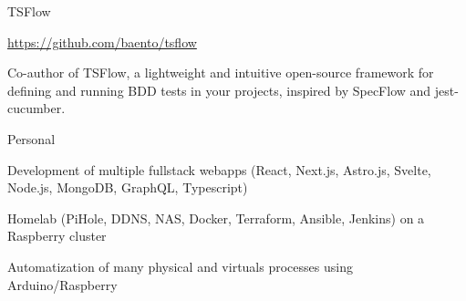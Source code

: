 
\begin{cventries}
  \cventrywithouttitleanddate
    {TSFlow} %
    {} %
    {
      \begin{cvitems} %
        \item {\href{https://github.com/baento/tsflow}{https://github.com/baento/tsflow}}
        \item {Co-author of TSFlow, a lightweight and intuitive open-source framework for defining and running BDD tests in your projects, inspired by SpecFlow and jest-cucumber.}
      \end{cvitems}
    }

  \cventry
    {} %
    {Personal} %
    {} %
    {} %
    {
      \begin{cvitems} %
        \item {Development of multiple fullstack webapps (React, Next.js, Astro.js, Svelte, Node.js, MongoDB, GraphQL, Typescript)}
        \item {Homelab (PiHole, DDNS, NAS, Docker, Terraform, Ansible, Jenkins) on a Raspberry cluster}
        \item {Automatization of many physical and virtuals processes using Arduino/Raspberry}
      \end{cvitems}
    }

\end{cventries}